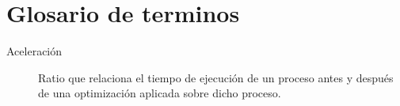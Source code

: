 \chapter{Glosario de terminos}
\label{chap:glosario-terminos}

\begin{description}
 \item [Aceleración] Ratio que relaciona el tiempo de ejecución de un proceso antes y después de una optimización aplicada sobre dicho proceso. 
\end{description}
